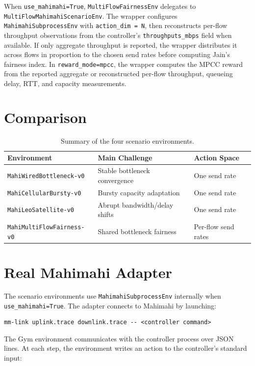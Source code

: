 \documentclass[11pt]{article}
\begin{document}
When \texttt{use\_mahimahi=True}, \texttt{MultiFlowFairnessEnv} delegates to
\texttt{MultiFlowMahimahiScenarioEnv}. The wrapper configures
\texttt{MahimahiSubprocessEnv} with \texttt{action\_dim = N}, then reconstructs
per-flow throughput observations from the controller's
\texttt{throughputs\_mbps} field when available. If only aggregate throughput is
reported, the wrapper distributes it across flows in proportion to the chosen
send rates before computing Jain's fairness index. In
\texttt{reward\_mode=mpcc}, the wrapper computes the MPCC reward from the
reported aggregate or reconstructed per-flow throughput, queueing delay, RTT,
and capacity measurements.

\section{Comparison}

\begin{table}[h]
\centering
\begin{tabular}{lll}
\toprule
Environment & Main Challenge & Action Space \\
\midrule
\texttt{MahiWiredBottleneck-v0} & Stable bottleneck convergence & One send rate \\
\texttt{MahiCellularBursty-v0} & Bursty capacity adaptation & One send rate \\
\texttt{MahiLeoSatellite-v0} & Abrupt bandwidth/delay shifts & One send rate \\
\texttt{MahiMultiFlowFairness-v0} & Shared bottleneck fairness & Per-flow send rates \\
\bottomrule
\end{tabular}
\caption{Summary of the four scenario environments.}
\end{table}

\section{Real Mahimahi Adapter}

The scenario environments use \texttt{MahimahiSubprocessEnv} internally when
\texttt{use\_mahimahi=True}. The adapter connects to Mahimahi by launching:

\begin{verbatim}
mm-link uplink.trace downlink.trace -- <controller command>
\end{verbatim}

The Gym environment communicates with the controller process over JSON lines.
At each step, the environment writes an action to the controller's standard
input:
\end{document}
